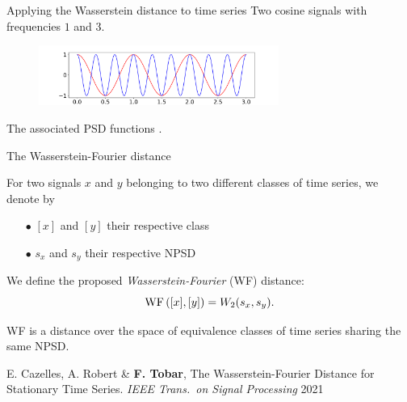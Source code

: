 \documentclass[pdf,aspectratio=169,10pt]{beamer}
\begin{document}
\begin{frame}{ Applying the Wasserstein distance to time series}
Two cosine signals with frequencies $1$ and $3$.
\begin{figure}
\includegraphics[width=0.7\textwidth]{../img/cosinus.pdf}
\end{figure}
The associated PSD functions .  
 
\centering
{}
\end{frame}




\begin{frame}{ The Wasserstein-Fourier distance}
\thispagestyle{empty}
\begin{definition}
For two signals $x$ and $y$ belonging to two different classes of time series, we denote by
\begin{itemize}
\item[$\bullet$] $[x]$ and $[y]$ their respective class
\item[$\bullet$] $s_x$ and $s_y$ their respective NPSD
\end{itemize}
We define the proposed \textit{Wasserstein-Fourier} (WF) distance:
$$\operatorname{WF}\left([x],[y]\right)=W_2(s_x,s_y).$$
\end{definition}

\begin{theorem}
WF is a distance over the space of equivalence classes of time series
sharing the same NPSD.
\end{theorem}
\vfill

\noindent \tiny E. Cazelles, A. Robert \& \textbf{F. Tobar}, The Wasserstein-Fourier Distance for Stationary Time Series. \emph{IEEE Trans.~on Signal Processing} 2021

\end{frame}
\end{document}
